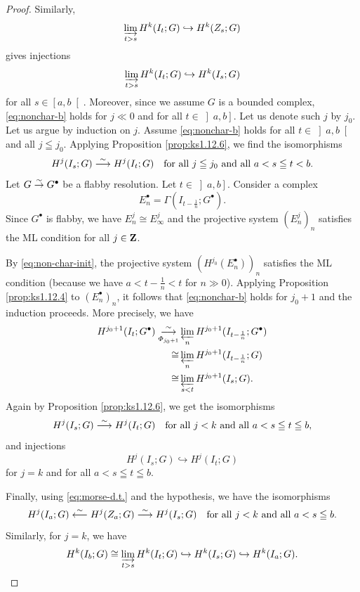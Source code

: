 \begin{proof}
{      Similarly, \[
        \indlim[t>s] H^{k}(I_t;G)\hookrightarrow H^{k}(Z_s;G)
    \] gives injections \[
        \indlim[t>s] H^{k}(I_t;G)\hookrightarrow H^{k}(I_s;G)
    \] for all \(s\in \left[a,b\right[\). 
  } Moreover, since we assume \(G\) is a bounded complex, 
  \ref{eq:nonchar-b} holds for \(j\ll0\) 
  and for all \(t\in \left]a,b\right]\). 
  Let us denote such \(j\) by \(j_0\). 
  Let us argue by induction on \(j\). 
  Assume \ref{eq:nonchar-b} holds for all 
  \(t\in\left]a,b\right[\) and all \(j\leqq j_0\). 
  Applying Proposition \ref{prop:ks1.12.6}, 
  we find the isomorphisms \begin{equation}\label{eq:non-char-init}
    H^{j}(I_s;G) \simarr H^{j}(I_t;G)
    \quad
    \text{for all \(j\leqq j_0\) and all \(a<s\leqq t< b\).}
  \end{equation}
  Let \(G \simar G^{\bullet}\) be a flabby resolution. 
  Let \(t\in\left]a,b\right]\). 
  Consider a complex \[
    E^{\bullet}_{n}=\Gamma(I_{t-\frac{1}{n}};G^{\bullet}).
  \]
  Since \(G^{\bullet}\) is flabby, 
  we have \(E_{n}^{j}\cong E_{\infty}^{j}\) and 
  the projective system \((E^{j}_{n})_{n}\) satisfies 
  the ML condition for all \(j\in\zz\). 
  
  By \eqref{eq:non-char-init}, the projective system \(
    (H^{j_0}(E^{\bullet}_{n}))_{n}
  \) satisfies the ML condition (because we have \(
    a<t-\frac{1}{n}<t
  \) for \(n\gg0\)). 
  Applying Proposition \ref{prop:ks1.12.4} to \(
    (E^{\bullet}_{n})_{n}
  \), it follows that \ref{eq:nonchar-b} holds for \(j_{0}+1\) 
  and the induction proceeds. More precisely, we have \begin{align*}
    H^{j_0+1}(I_{t};G^{\bullet})
    \overunderset{\sim}{\varPhi_{j_{0}+1}}{\longrightarrow}&
    \prolim[n]H^{j_0+1}(I_{t-\frac{1}{n}};G^{\bullet})\\
    \cong&
    \prolim[n]H^{j_0+1}(I_{t-\frac{1}{n}};G)\\
    \cong&
    \prolim[s<t]H^{j_0+1}(I_{s};G).
  \end{align*}
  Again by Proposition \ref{prop:ks1.12.6}, 
  we get the isomorphisms\[
    H^{j}(I_{s};G)\simarr H^{j}(I_t;G)
    \quad
    \text{for all \(j<k\) and all \(a<s\leqq t\leqq b\),}
  \]
  and injections \[
    H^{j}(I_{s};G)\hookrightarrow H^{j}(I_t;G)
  \] for \(j=k\) and for all \(a<s\leqq t\leqq b\). 

  Finally, using \eqref{eq:morse-d.t.} and the hypothesis, 
  we have the isomorphisms\[
    H^{j}(I_{a};G)\simrra
    H^{j}(Z_{a};G)\simarr H^{j}(I_s;G)
    \quad
    \text{for all \(j<k\) and all \(a<s\leqq b\).}
  \]
  Similarly, for \(j=k\), we have\[
    H^{k}(I_{b};G) \cong \indlim[t>s] H^{k}(I_t;G)\hookrightarrow H^{k}(I_s;G) \hookrightarrow H^{k}(I_{a};G).
  \]
\end{proof}

